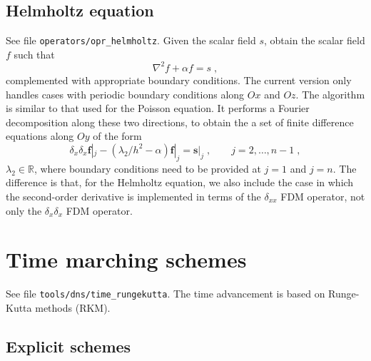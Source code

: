 {\subsection{Helmholtz equation}
\label{sec:helmholtz}

See file {\tt operators/opr\_helmholtz}. Given the scalar field $s$, obtain the scalar field $f$ such that
\begin{equation}
\nabla^2 f + \alpha f= s \;,
\end{equation}
complemented with appropriate boundary conditions. The current version only handles cases with periodic boundary conditions along $Ox$ and $Oz$. The algorithm is similar to that used for the Poisson equation. It performs a Fourier decomposition along these two directions, to obtain the a set of finite difference equations along $Oy$ of the form
\begin{equation}
  \delta_x \delta_x \mathbf{f}|_j - (\lambda_2/h^2-\alpha)\mathbf{f}|_j=\mathbf{s}|_j
  \;,\qquad j=2,\ldots,n-1 \;,
\end{equation}
$\lambda_2\in\mathbb{R}$, where boundary conditions need to be provided at $j=1$ and $j=n$. The difference is that, for the Helmholtz equation, we also include the case in which the second-order derivative is implemented in terms of the $\delta_{xx}$ FDM operator, not only the $\delta_x\delta_x$ FDM operator.

\section{Time marching schemes}

See file {\tt tools/dns/time\_rungekutta}. The time advancement is based on
Runge-Kutta methods (RKM).

\subsection{Explicit schemes}

}
